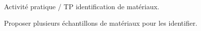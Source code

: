 \begin{myact}{}
	Activité pratique / TP identification de matériaux.
	
	Proposer plusieurs échantillons de matériaux pour les identifier.
\end{myact}